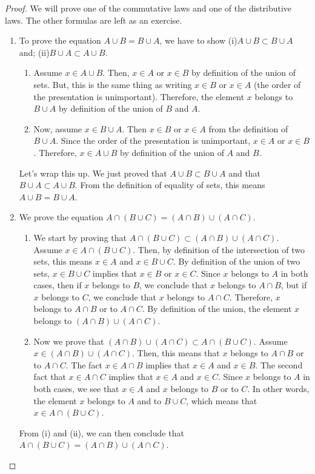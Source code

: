     \begin{proof}
    We will prove one of the commutative laws and one of the distributive laws. The other formulas are left as an exercise.

    \begin{enumerate}[label=\alph*)]
    \item To prove the equation $A \cup B = B \cup A$, we have to show (i)$A \cup B \subset B \cup A$ and; (ii)$B \cup A \subset A \cup B$. 
        \begin{enumerate}[label=(\roman*)]
        \item Assume $x \in A \cup B$. Then, $x \in A$ or $x \in B$ by definition of the union of sets. But, this is the same thing as writing $x \in B$ or $x \in A$ (the order of the presentation is unimportant). Therefore, the element $x$ belongs to $B \cup A$ by definition of the union of $B$ and $A$. 
        \item Now, assume $x \in B \cup A$. Then $x \in B$ or $x \in A$ from the definition of $B \cup A$. Since the order of the presentation is unimportant, $x \in A$ or $x \in B$. Therefore, $x \in A \cup B$ by definition of the union of $A$ and $B$. 
        \end{enumerate}
        Let's wrap this up. We just proved that $A \cup B \subset B \cup A$ and that $B \cup A \subset A \cup B$. From the definition of equality of sets, this means $A \cup B = B \cup A$.
    \item We prove the equation $A \cap (B \cup C) = (A \cap B) \cup (A \cap C)$. 
        \begin{enumerate}[label=(\roman*)]
        \item We start by proving that $A \cap (B \cup C) \subset (A \cap B) \cup (A \cap C)$. Assume $x \in A \cap (B \cup C)$. Then, by definition of the intersection of two sets, this means $x \in A$ and $x \in B \cup C$. By definition of the union of two sets, $x \in B \cup C$ implies that $x \in B$ or $x \in C$. Since $x$ belongs to $A$ in both cases, then if $x$ belongs to $B$, we conclude that $x$ belongs to $A \cap B$, but if $x$ belongs to $C$, we conclude that $x$ belongs to $A \cap C$. Therefore, $x$ belongs to $A \cap B$ or to $A \cap C$. By definition of the union, the element $x$ belongs to $(A \cap B) \cup (A \cap C)$. 
        \item Now we prove that $(A \cap B) \cup (A \cap C) \subset A \cap (B \cup C)$. Assume $x \in (A \cap B) \cup (A \cap C)$. Then, this means that $x$ belongs to $A \cap B$ or to $A \cap C$. The fact $x \in A \cap B$ implies that $x \in A$ and $x \in B$. The second fact that $x \in A \cap C$ implies that $x \in A$ and $x \in C$. Since $x$ belongs to $A$ in both cases, we see that $x \in A$ and $x$ belongs to $B$ or to $C$. In other words, the element $x$ belongs to $A$ and to $B \cup C$, which means that $x \in A \cap (B \cup C)$.
        \end{enumerate}
        From (i) and (ii), we can then conclude that $A \cap (B \cup C) = (A \cap B) \cup (A \cap C)$.
    \end{enumerate}
    \end{proof}


